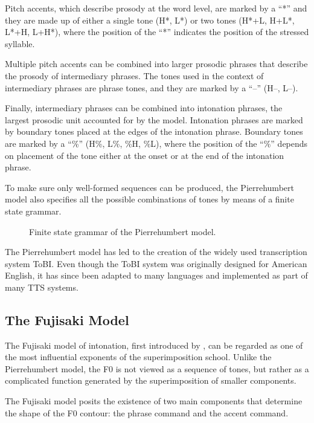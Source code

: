 Pitch accents, which describe prosody at the word level, are marked by a ``*'' and they are made up of either a single tone (H*, L*) or two tones (H*+L, H+L*, L*+H, L+H*), where the position of the ``*'' indicates the position of the stressed syllable.

Multiple pitch accents can be combined into larger prosodic phrases that describe the prosody of intermediary phrases.
The tones used in the context of intermediary phrases are phrase tones, and they are marked by a ``--'' (H--, L--).

Finally, intermediary phrases can be combined into intonation phrases, the largest prosodic unit accounted for by the model.
Intonation phrases are marked by boundary tones placed at the edges of the intonation phrase.
Boundary tones are marked by a ``\%'' (H\%, L\%, \%H, \%L), where the position of the ``\%'' depends on placement of the tone either at the onset or at the end of the intonation phrase.

To make sure only well-formed sequences can be produced, the Pierrehumbert model also specifies all the possible combinations of tones by means of a finite state grammar.


\begin{figure}[H]
\centering
\scalebox{0.9}{}
\caption[Pierrehumbert model finite state grammar]{Finite state grammar of the Pierrehumbert model.}
\label{fig:1}
\end{figure}

The Pierrehumbert model has led to the creation of the widely used transcription system \ac{ToBI}.
Even though the \ac{ToBI} system was originally designed for American English, it has since been adapted to many languages and implemented as part of many \ac{TTS} systems.




\subsection{The Fujisaki Model}

The Fujisaki model of intonation, first introduced by \citet{Fujisaki1983Dynamic}, can be regarded as one of the most influential exponents of the superimposition school.
Unlike the Pierrehumbert model, the \ac{F0} is not viewed as a sequence of tones, but rather as a complicated function generated by the superimposition of smaller components.

The Fujisaki model posits the existence of two main components that determine the shape of the \ac{F0} contour: the phrase command and the accent command.

